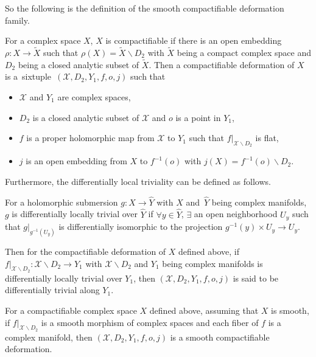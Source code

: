 \documentclass[pdftex]{sigma}
\numberwithin{equation}{section}
\begin{document}
So the following is the definition of the smooth compactifiable deformation family.

\begin{Definition} \label{Definition3.10}
For a complex space $X$, $X$ is compactifiable if there is an open embedding $\rho\colon X\rightarrow \widetilde{X}$ such that $\rho(X)=\widetilde{X} \backslash D_2$ with $\widetilde{X}$ being a compact complex space and $D_2$ being a closed analytic subset of $\widetilde{X}$. Then a compactifiable deformation of $X$ is a~sixtuple~$(\mathcal{X},D_2,Y_1,f,o,j)$ such that
\begin{itemize}\itemsep=0pt
\item[$(1)$] $\mathcal{X}$ and $Y_1$ are complex spaces,
\item[$(2)$] $D_2$ is a closed analytic subset of $\mathcal{X}$ and $o$ is a point in $Y_1$,
\item[$(3)$] $f$ is a proper holomorphic map from $\mathcal{X}$ to $Y_1$ such that $f|_{\mathcal{X} \backslash D_2}$ is flat,
\item[$(4)$] $j$ is an open embedding from $X$ to $f^{-1}(o)$ with $j(X)=f^{-1}(o)\backslash D_2$.
\end{itemize}
\end{Definition}

Furthermore, the differentially local triviality can be defined as follows.

\begin{Definition} \label{Definition3.11}
For a holomorphic submersion $g\colon X \rightarrow \hat{Y}$ with $X$ and~$\hat{Y}$ being complex manifolds, $g$ is differentially locally trivial over $\hat{Y}$ if $\forall y \in \hat{Y}$, $\exists$ an open neighborhood $U_y$ such that $g|_{g^{-1}(U_y)}$ is differentially isomorphic to the projection ${g^{-1}(y) \times U_y \rightarrow U_y}$.
\end{Definition}

Then for the compactifiable deformation of $X$ defined above, if $f|_{\mathcal{X} \backslash D_2 }\colon \mathcal{X} \backslash D_2\rightarrow Y_1$ with $\mathcal{X} \backslash D_2$ and $Y_1$ being complex manifolds is differentially locally trivial over $Y_1$, then $(\mathcal{X}, D_2, Y_1,f,\allowbreak o,j)$ is said to be differentially trivial along $Y_1$.

\begin{Definition} \label{Definition3.12}
For a compactifiable complex space $X$ defined above, assuming that $X$ is smooth, if $f|_{\mathcal{X}\backslash D_2}$ is a smooth morphism of complex spaces and each fiber of $f$ is a complex manifold, then $(\mathcal{X}, D_2, Y_1,f, o, j)$ is a smooth compactifiable deformation.
\end{Definition}
\end{document}

